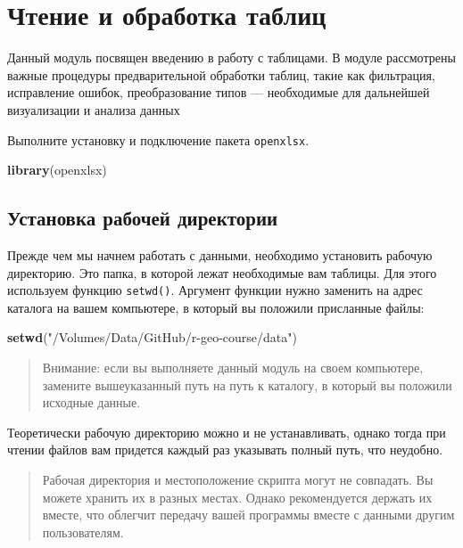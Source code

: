 \documentclass[]{book}
\newenvironment{Shaded}{\begin{snugshade}}{\end{snugshade}}
\newcommand{\KeywordTok}[1]{\textcolor[rgb]{0.13,0.29,0.53}{\textbf{#1}}}
\newcommand{\StringTok}[1]{\textcolor[rgb]{0.31,0.60,0.02}{#1}}
\newcommand{\NormalTok}[1]{#1}
\begin{document}
\chapter{Чтение и обработка таблиц}\label{tables}

Данный модуль посвящен введению в работу с таблицами. В модуле
рассмотрены важные процедуры предварительной обработки таблиц, такие как
фильтрация, исправление ошибок, преобразование типов --- необходимые для
дальнейшей визуализации и анализа данных

Выполните установку и подключение пакета \texttt{openxlsx}.

\begin{Shaded}
\begin{Highlighting}[]
\KeywordTok{library}\NormalTok{(openxlsx)}
\end{Highlighting}
\end{Shaded}

\section{Установка рабочей директории}\label{set_directory}

Прежде чем мы начнем работать с данными, необходимо установить рабочую
директорию. Это папка, в которой лежат необходимые вам таблицы. Для
этого используем функцию \texttt{setwd()}. Аргумент функции нужно
заменить на адрес каталога на вашем компьютере, в который вы положили
присланные файлы:

\begin{Shaded}
\begin{Highlighting}[]
\KeywordTok{setwd}\NormalTok{(}\StringTok{"/Volumes/Data/GitHub/r-geo-course/data"}\NormalTok{)}
\end{Highlighting}
\end{Shaded}

\begin{quote}
Внимание: если вы выполняете данный модуль на своем компьютере, замените
вышеуказанный путь на путь к каталогу, в который вы положили исходные
данные.
\end{quote}

Теоретически рабочую директорию можно и не устанавливать, однако тогда
при чтении файлов вам придется каждый раз указывать полный путь, что
неудобно.

\begin{quote}
Рабочая директория и местоположение скрипта могут не совпадать. Вы
можете хранить их в разных местах. Однако рекомендуется держать их
вместе, что облегчит передачу вашей программы вместе с данными другим
пользователям.
\end{quote}
\end{document}

